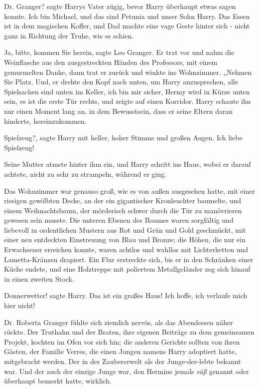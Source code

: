 \glqq{}Dr. Granger?\grqq{} sagte Harrys Vater zügig, bevor Harry überhaupt etwas
sagen konnte. \glqq{}Ich bin Michael, und das sind Petunia und unser Sohn Harry.
Das Essen ist in dem magischen Koffer\grqq{}, und Dad machte eine vage Geste
hinter sich - nicht ganz in Richtung der Truhe, wie es schien.

\glqq{}Ja, bitte, kommen Sie herein\grqq{}, sagte Leo Granger. Er trat vor und
nahm die Weinflasche aus den ausgestreckten Händen des Professors, mit einem
gemurmelten \glqq{}Danke\grqq{}, dann trat er zurück und winkte ins Wohnzimmer.
„Nehmen Sie Platz. Und\grqq{}, er drehte den Kopf nach unten, um Harry
anzusprechen, \glqq{}alle Spielsachen sind unten im Keller, ich bin mir sicher,
Hermy wird in Kürze unten sein, es ist die erste Tür rechts\grqq{}, und zeigte
auf einen Korridor. Harry schaute ihn nur einen Moment lang an, in dem
Bewusstsein, dass er seine Eltern daran hinderte, hereinzukommen.

\glqq{}Spielzeug?\grqq{}, sagte Harry mit heller, hoher Stimme und großen Augen.
\glqq{}Ich liebe Spielzeug!\grqq{}

Seine Mutter atmete hinter ihm ein, und Harry schritt ins Haus, wobei er darauf
achtete, nicht zu sehr zu strampeln, während er ging.

Das Wohnzimmer war genauso groß, wie es von außen ausgesehen hatte, mit einer
riesigen gewölbten Decke, an der ein gigantischer Kronleuchter baumelte, und
einem Weihnachtsbaum, der mörderisch schwer durch die Tür zu manövrieren gewesen
sein musste. Die unteren Ebenen des Baumes waren sorgfältig und liebevoll in
ordentlichen Mustern aus Rot und Grün und Gold geschmückt, mit einer neu
entdeckten Einstreuung von Blau und Bronze; die Höhen, die nur ein Erwachsener
erreichen konnte, waren achtlos und wahllos mit Lichterketten und
Lametta-Kränzen drapiert. Ein Flur erstreckte sich, bis er in den Schränken
einer Küche endete, und eine Holztreppe mit poliertem Metallgeländer zog sich
hinauf in einen zweiten Stock.

\glqq{}Donnerwetter!\grqq{} sagte Harry. \glqq{}Das ist ein großes Haus! Ich
hoffe, ich verlaufe mich hier nicht!\grqq{}

Dr. Roberta Granger fühlte sich ziemlich nervös, als das Abendessen näher
rückte. Der Truthahn und der Braten, ihre eigenen Beiträge zu dem gemeinsamen
Projekt, kochten im Ofen vor sich hin; die anderen Gerichte sollten von ihren
Gästen, der Familie Verres, die einen Jungen namens Harry adoptiert hatte,
mitgebracht werden. Der in der Zaubererwelt als der Junge-der-lebte bekannt war.
Und der auch der einzige Junge war, den Hermine jemals \glqq{}\emph{süß}\grqq{}
genannt oder überhaupt bemerkt hatte, wirklich.

